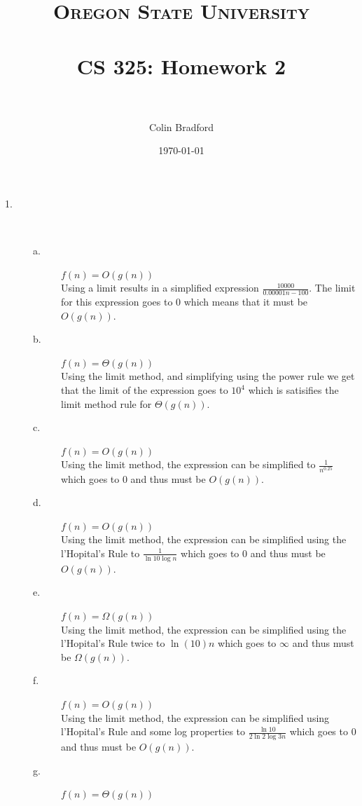 \documentclass[paper=a4, fontsize=11pt]{scrartcl} %
\title{ 
\normalfont \normalsize 
\textsc{Oregon State University} \\ [25pt]
\horrule{0.5pt} \\[0.4cm] %
\huge CS 325: Homework 2 \\ %
\horrule{2pt} \\[0.5cm] %
}
\author{Colin Bradford} %
\date{\normalsize\today} %
\numberwithin{equation}{section} %
\numberwithin{figure}{section} %
\numberwithin{table}{section} %
\begin{document}
\maketitle %

\begin{description}
    \item[1.] \hfill \\
        \begin{description}
        \item[a.] $f(n) = O(g(n))$ \\
            Using a limit results in a simplified expression $\frac{ 10000 }{ 0.00001n - 100 }$. The limit for
            this expression goes to 0 which means that it must be $O(g(n))$.
        \item[b.] $f(n) = \Theta(g(n))$ \\
            Using the limit method, and simplifying using the power rule we get that the limit of the expression
            goes to $10^4$ which is satisifies the limit method rule for $\Theta(g(n))$.
        \item[c.] $f(n) = O(g(n))$ \\
            Using the limit method, the expression can be simplified to $\frac{ 1 }{ n^{0.25} }$ which goes to 0
            and thus must be $O(g(n))$.
        \item[d.] $f(n) = O(g(n))$ \\
            Using the limit method, the expression can be simplified using the l'Hopital's Rule to $\frac{ 1 }{ \ln{10}\log{n} }$
            which goes to 0 and thus must be $O(g(n))$.
        \item[e.] $f(n) = \Omega(g(n))$ \\
            Using the limit method, the expression can be simplified using the l'Hopital's Rule twice to
            $\ln(10)n$ which goes to $\infty$ and thus must be $\Omega(g(n))$.
        \item[f.] $f(n) = O(g(n))$ \\
            Using the limit method, the expression can be simplified using l'Hopital's Rule and some log properties to
            $\frac{ \ln{10} }{ 2\ln{2}\log{3n} }$ which goes to 0 and thus must be $O(g(n))$.
        \item[g.] $f(n) = \Theta(g(n))$ \\

\end{description}
\end{description}
\end{document}
